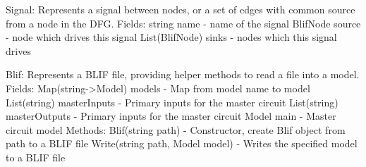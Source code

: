 \documentclass[12pt,draft,oneside]{article} %
\begin{document}
Signal: Represents a signal between nodes, or a set of edges with common
source from a node in the DFG.
Fields:
   string name - name of the signal
   BlifNode source - node which drives this signal
   List(BlifNode) sinks - nodes which this signal drives

Blif: Represents a BLIF file, providing helper methods to read a file into a
model.
Fields:
   Map(string->Model) models - Map from model name to model
   List(string) masterInputs - Primary inputs for the master circuit
   List(string) masterOutputs - Primary inputs for the master circuit
   Model main - Master circuit model
Methods:
   Blif(string path) - Constructor, create Blif object from path to a BLIF
   file
   Write(string path, Model model) - Writes the specified model to a BLIF file
\end{document}
